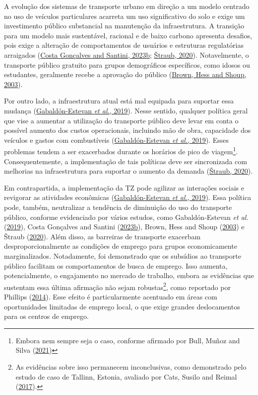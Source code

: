 \documentclass[12pt, a4paper, twoside]{article}
\numberwithin{equation}{subsection} %
\begin{document}
A evolução dos sistemas de transporte urbano em direção a um modelo
centrado no uso de veículos particulares acarreta um uso significativo
do solo e exige um investimento público substancial na manutenção da
infraestrutura. A transição para um modelo mais sustentável, racional e
de baixo carbono apresenta desafios, pois exige a alteração de
comportamentos de usuários e estruturas regulatórias arraigados
(\protect\hyperlink{ref-Gonuxe7alves_Santini_2023}{Costa Gonçalves and
Santini, 2023b}; \protect\hyperlink{ref-straub_2020}{Štraub, 2020}).
Notavelmente, o transporte público gratuito para grupos demográficos
específicos, como idosos ou estudantes, geralmente recebe a aprovação do
público (\protect\hyperlink{ref-Brown_2003}{Brown, Hess and Shoup,
2003}).

Por outro lado, a infraestrutura atual está mal equipada para suportar
essa mudança
(\protect\hyperlink{ref-Gabaldon_ffpt_2019}{Gabaldón-Estevan \emph{et
al.}, 2019}). Nesse sentido, qualquer política geral que vise a aumentar
a utilização do transporte público deve levar em conta o possível
aumento dos custos operacionais, incluindo mão de obra, capacidade dos
veículos e gastos com combustíveis
(\protect\hyperlink{ref-Gabaldon_ffpt_2019}{Gabaldón-Estevan \emph{et
al.}, 2019}). Esses problemas tendem a ser exacerbados durante os
horários de pico de viagem\footnote{Embora nem sempre seja o caso,
  conforme afirmado por Bull, Muñoz and Silva
  (\protect\hyperlink{ref-BULL-RCT-2021}{2021})}. Consequentemente, a
implementação de tais políticas deve ser sincronizada com melhorias na
infraestrutura para suportar o aumento da demanda
(\protect\hyperlink{ref-straub_2020}{Štraub, 2020}).

Em contrapartida, a implementação da TZ pode agilizar as interações
sociais e revigorar as atividades econômicas
(\protect\hyperlink{ref-Gabaldon_ffpt_2019}{Gabaldón-Estevan \emph{et
al.}, 2019}). Essa política pode, também, neutralizar a tendência de
diminuição do uso do transporte público, conforme evidenciado por vários
estudos, como Gabaldón-Estevan \emph{et al.}
(\protect\hyperlink{ref-Gabaldon_ffpt_2019}{2019}), Costa Gonçalves and
Santini (\protect\hyperlink{ref-Gonuxe7alves_Santini_2023}{2023b}),
Brown, Hess and Shoup (\protect\hyperlink{ref-Brown_2003}{2003}) e
Štraub (\protect\hyperlink{ref-straub_2020}{2020}). Além disso, as
barreiras de transporte exacerbam desproporcionalmente as condições de
emprego para grupos economicamente marginalizados. Notadamente, foi
demonstrado que os subsídios ao transporte público facilitam os
comportamentos de busca de emprego. Isso aumenta, potencialmente, o
engajamento no mercado de trabalho, embora as evidências que sustentam
essa última afirmação não sejam robustas\footnote{As evidências sobre
  isso permanecem inconclusivas, como demonstrado pelo estudo de caso de
  Tallinn, Estonia, avaliado por Cats, Susilo and Reimal
  (\protect\hyperlink{ref-cats_prospects_2017}{2017}).}, como reportado
por Phillips (\protect\hyperlink{ref-PHILLIPS2014}{2014}). Esse efeito é
particularmente acentuado em áreas com oportunidades limitadas de
emprego local, o que exige grandes deslocamentos para os centros de
emprego.
\end{document}
